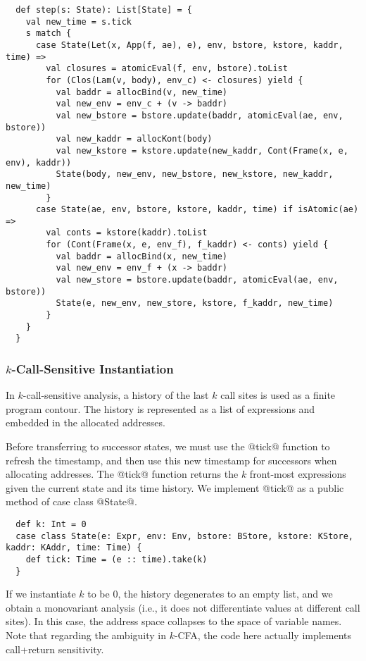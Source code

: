 \documentclass[acmsmall, review]{acmart}\settopmatter{}
\begin{document}
\begin{lstlisting}
  def step(s: State): List[State] = {
    val new_time = s.tick
    s match {
      case State(Let(x, App(f, ae), e), env, bstore, kstore, kaddr, time) =>
        val closures = atomicEval(f, env, bstore).toList
        for (Clos(Lam(v, body), env_c) <- closures) yield {
          val baddr = allocBind(v, new_time)
          val new_env = env_c + (v -> baddr)
          val new_bstore = bstore.update(baddr, atomicEval(ae, env, bstore))
          val new_kaddr = allocKont(body)
          val new_kstore = kstore.update(new_kaddr, Cont(Frame(x, e, env), kaddr))
          State(body, new_env, new_bstore, new_kstore, new_kaddr, new_time)
        }
      case State(ae, env, bstore, kstore, kaddr, time) if isAtomic(ae) =>
        val conts = kstore(kaddr).toList
        for (Cont(Frame(x, e, env_f), f_kaddr) <- conts) yield {
          val baddr = allocBind(x, new_time)
          val new_env = env_f + (x -> baddr)
          val new_store = bstore.update(baddr, atomicEval(ae, env, bstore))
          State(e, new_env, new_store, kstore, f_kaddr, new_time)
        }
    }
  }
\end{lstlisting}

\subsubsection{$k$-Call-Sensitive Instantiation} \label{kcfainst}

In $k$-call-sensitive analysis, a history of the last $k$ call sites is used as a 
finite program contour. The history is represented as a list of expressions and embedded
in the allocated addresses.

Before transferring to successor states, we must use the @tick@ function to refresh the 
timestamp, and then use this new timestamp for successors when allocating addresses.
The @tick@ function returns the $k$ front-most expressions given the current state and its
time history. We implement @tick@ as a public method of case class @State@.

\begin{lstlisting}
  def k: Int = 0
  case class State(e: Expr, env: Env, bstore: BStore, kstore: KStore, kaddr: KAddr, time: Time) {
    def tick: Time = (e :: time).take(k)
  }
\end{lstlisting}

If we instantiate $k$ to be $0$, the history degenerates to an empty list, and we obtain
a monovariant analysis (i.e., it does not differentiate values at different call sites).
In this case, the address space collapses to the space of variable names.
Note that regarding the ambiguity in $k$-CFA\cite{Gilray:2016:ACP:2951913.2951936},
the code here actually implements call+return sensitivity.
\end{document}
